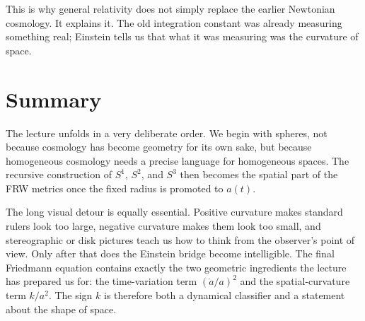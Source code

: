 This is why general relativity does not simply replace the earlier Newtonian cosmology. It explains it. The old integration constant was already measuring something real; Einstein tells us that what it was measuring was the curvature of space.

\section{Summary}

The lecture unfolds in a very deliberate order. We begin with spheres, not because cosmology has become geometry for its own sake, but because homogeneous cosmology needs a precise language for homogeneous spaces. The recursive construction of \(S^1\), \(S^2\), and \(S^3\) then becomes the spatial part of the FRW metrics once the fixed radius is promoted to \(a(t)\).

The long visual detour is equally essential. Positive curvature makes standard rulers look too large, negative curvature makes them look too small, and stereographic or disk pictures teach us how to think from the observer's point of view. Only after that does the Einstein bridge become intelligible. The final Friedmann equation contains exactly the two geometric ingredients the lecture has prepared us for: the time-variation term \((\dot a/a)^2\) and the spatial-curvature term \(k/a^2\). The sign \(k\) is therefore both a dynamical classifier and a statement about the shape of space.
